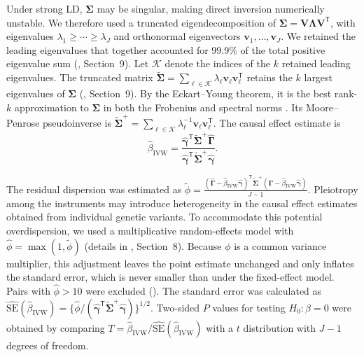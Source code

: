 \noindent Under strong LD, $\boldsymbol{\Sigma}$ may be singular, making direct inversion numerically unstable. We therefore used a truncated eigendecomposition of $\boldsymbol{\Sigma}=\boldsymbol V\boldsymbol{\Lambda}\boldsymbol V^{\mathsf T}$, with eigenvalues $\lambda_1\geq\cdots\geq\lambda_J$ and orthonormal eigenvectors $\boldsymbol v_1,\ldots,\boldsymbol v_J$. We retained the leading eigenvalues that together accounted for 99.9\% of the total positive eigenvalue sum (, Section~9). Let $\mathcal K$ denote the indices of the $k$ retained leading eigenvalues. The truncated matrix $\widetilde{\boldsymbol{\Sigma}}=\sum_{\ell\in\mathcal K}\lambda_\ell\boldsymbol v_\ell\boldsymbol v_\ell^{\mathsf T}$ retains the $k$ largest eigenvalues of $\boldsymbol{\Sigma}$ (, Section~9). By the Eckart--Young theorem, it is the best rank-$k$ approximation to $\boldsymbol{\Sigma}$ in both the Frobenius and spectral norms \cite{eckart1936approximation}. Its Moore--Penrose pseudoinverse is $\widetilde{\boldsymbol{\Sigma}}^{+}=\sum_{\ell\in\mathcal K}\lambda_\ell^{-1}\boldsymbol v_\ell\boldsymbol v_\ell^{\mathsf T}$. The causal effect estimate is
\begin{equation*}
\hat{\beta}_{\text{IVW}}
=
\frac{
\hat{\boldsymbol{\gamma}}^{\mathsf T}
\widetilde{\boldsymbol{\Sigma}}^{+}
\hat{\boldsymbol{\Gamma}}
}{
\hat{\boldsymbol{\gamma}}^{\mathsf T}
\widetilde{\boldsymbol{\Sigma}}^{+}
\hat{\boldsymbol{\gamma}}
}.
\end{equation*}

\noindent The residual dispersion was estimated as $\widetilde{\phi}=\frac{(\hat{\boldsymbol{\Gamma}}-\hat{\beta}_{\text{IVW}}\hat{\boldsymbol{\gamma}})^{\mathsf T}\widetilde{\boldsymbol{\Sigma}}^{+}(\hat{\boldsymbol{\Gamma}}-\hat{\beta}_{\text{IVW}}\hat{\boldsymbol{\gamma}})}{J-1}$. Pleiotropy among the instruments may introduce heterogeneity in the causal effect estimates obtained from individual genetic variants. To accommodate this potential overdispersion, we used a multiplicative random-effects model with $\hat{\phi}=\max(1,\widetilde{\phi})$ (details in , Section~8). Because $\phi$ is a common variance multiplier, this adjustment leaves the point estimate unchanged and only inflates the standard error, which is never smaller than under the fixed-effect model. Pairs with $\hat{\phi}>10$ were excluded (). The standard error was calculated as $\widehat{\mathrm{SE}}(\hat{\beta}_{\text{IVW}})=\{\hat{\phi}/(\hat{\boldsymbol{\gamma}}^{\mathsf T}\widetilde{\boldsymbol{\Sigma}}^{+}\hat{\boldsymbol{\gamma}})\}^{1/2}$. Two-sided $P$ values for testing $H_0:\beta=0$ were obtained by comparing $T=\hat{\beta}_{\text{IVW}}/\widehat{\mathrm{SE}}(\hat{\beta}_{\text{IVW}})$ with a $t$ distribution with $J-1$ degrees of freedom.

